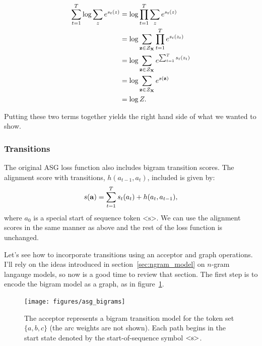 \begin{tcolorbox}[breakable, colback=white!95!black, colframe=white!45!black,
    sharp corners=all, title=Global or Local Normalization]
\begin{align*}
\sum_{t=1}^T \log \sum_z e^{s_t(z)} &= \log \prod_{t=1}^T \sum_z e^{s_t(z)} \\
&= \log \sum_{{\bf z} \in \mathcal{\mathcal{Z}_{\bf X}}} \prod_{t=1}^T e^{s_t(z_t)} \\
&= \log \sum_{{\bf z} \in \mathcal{\mathcal{Z}_{\bf X}}} e^{\sum_{t=1}^T s_t(z_t)} \\
&= \log \sum_{{\bf z} \in \mathcal{\mathcal{Z}_{\bf X}}} e^{s({\bf z})} \\
&= \log Z.
\end{align*}

Putting these two terms together yields the right hand side of what we wanted to show.
\end{tcolorbox}

\subsubsection{Transitions}

The original ASG loss function also includes bigram transition scores. The
alignment score with transitions, $h(a_{t-1}, a_t)$, included is given by:
$$
s({\bf a}) = \sum_{t=1}^T s_t(a_t) + h(a_t, a_{t-1}),
$$
where $a_0$ is a special start of sequence token $\textrm{<s>}$. We can use the
alignment scores in the same manner as above and the rest of the loss function
is unchanged.

Let's see how to incorporate transitions using an acceptor and graph
operations. I'll rely on the ideas introduced in section~\ref{sec:ngram_model}
on $n$-gram langauge models, so now is a good time to review that section. The
first step is to encode the bigram model as a graph, as in
figure~\ref{fig:asg_bigrams}.

\begin{figure}
    \centering
    \texttt{[image: figures/asg\_bigrams]}
    \caption{The acceptor represents a bigram transition model for the token
    set $\{a, b, c\}$ (the arc weights are not shown). Each path begins in the
    start state denoted by the start-of-sequence symbol $\textrm{<s>}$.}
    \label{fig:asg_bigrams}
\end{figure}

